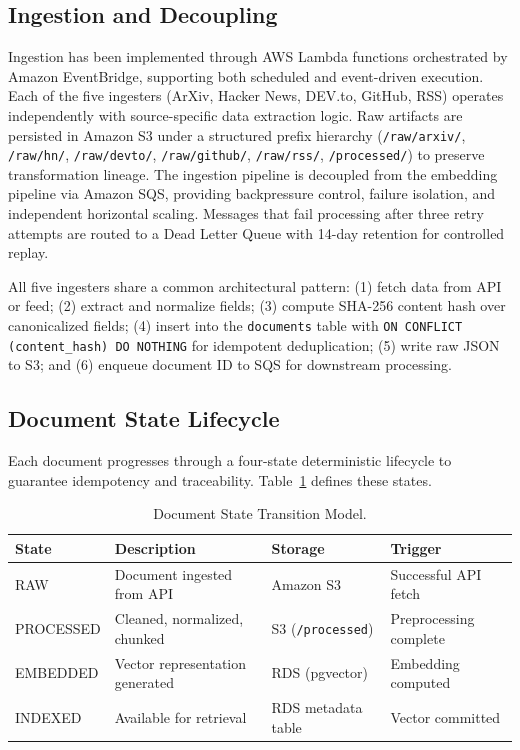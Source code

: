 \subsection{Ingestion and Decoupling}

Ingestion has been implemented through AWS Lambda functions orchestrated by Amazon EventBridge, supporting both scheduled and event-driven execution. Each of the five ingesters (ArXiv, Hacker News, DEV.to, GitHub, RSS) operates independently with source-specific data extraction logic. Raw artifacts are persisted in Amazon S3 under a structured prefix hierarchy (\texttt{/raw/arxiv/}, \texttt{/raw/hn/}, \texttt{/raw/devto/}, \texttt{/raw/github/}, \texttt{/raw/rss/}, \texttt{/processed/}) to preserve transformation lineage. The ingestion pipeline is decoupled from the embedding pipeline via Amazon SQS, providing backpressure control, failure isolation, and independent horizontal scaling. Messages that fail processing after three retry attempts are routed to a Dead Letter Queue with 14-day retention for controlled replay.

All five ingesters share a common architectural pattern: (1) fetch data from API or feed; (2) extract and normalize fields; (3) compute SHA-256 content hash over canonicalized fields; (4) insert into the \texttt{documents} table with \texttt{ON CONFLICT (content\_hash) DO NOTHING} for idempotent deduplication; (5) write raw JSON to S3; and (6) enqueue document ID to SQS for downstream processing.

\subsection{Document State Lifecycle}

Each document progresses through a four-state deterministic lifecycle to guarantee idempotency and traceability. Table~\ref{tab:doc_states} defines these states.

\begin{table}[H]
\caption{Document State Transition Model.}
\label{tab:doc_states}
\centering
\begin{tabular}{p{2.0cm}p{3.8cm}p{3.0cm}p{3.0cm}}
\toprule
\textbf{State} & \textbf{Description} & \textbf{Storage} & \textbf{Trigger} \\
\midrule
RAW & Document ingested from API & Amazon S3 & Successful API fetch \\
PROCESSED & Cleaned, normalized, chunked & S3 (\texttt{/processed}) & Preprocessing complete \\
EMBEDDED & Vector representation generated & RDS (pgvector) & Embedding computed \\
INDEXED & Available for retrieval & RDS metadata table & Vector committed \\
\bottomrule
\end{tabular}
\end{table}

